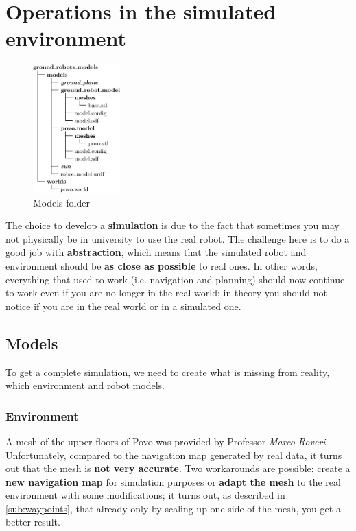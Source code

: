 \chapter{Operations in the simulated environment}
\label{cha:simworld}

\noindent\begin{figure}
    \includegraphics[width=0.3\textwidth]{images/models_folder}
    \caption{Models folder}
\end{figure}
The choice to develop a \textbf{simulation} is due to the fact that sometimes you may not physically be in university to use the real robot. The challenge here is to do a good job with \textbf{abstraction}, which means that the simulated robot and environment should be \textbf{as close as possible} to real ones. In other words, everything that used to work (i.e. navigation and planning) should now continue to work even if you are no longer in the real world; in theory you should not notice if you are in the real world or in a simulated one.

\section{Models}

To get a complete simulation, we need to create what is missing from reality, which environment and robot models.

\subsection{Environment}
\label{sub:map}

A mesh of the upper floors of Povo was provided by Professor \textit{Marco Roveri}\cite{roveri}. Unfortunately, compared to the navigation map generated by real data, it turns out that the mesh is \textbf{not very accurate}. Two workarounds are possible: create a \textbf{new navigation map} for simulation purposes or \textbf{adapt the mesh} to the real environment with some modifications; it turns out, as described in \autoref{sub:waypoints}, that already only by scaling up one side of the mesh, you get a better result. 

